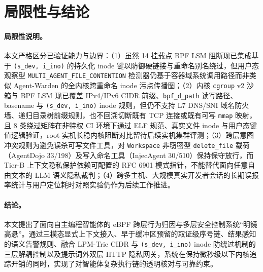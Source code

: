 \documentclass[UTF8,a4paper,zihao=-4,twocolumn]{ctexart}
\newcommand{\code}[1]{\texttt{\small #1}}
\begin{document}
\section{局限性与结论}
\label{sec:conclusion}

\paragraph{局限性说明。}
本文严格区分已验证能力与边界：（1）虽然 14 挂载点 BPF LSM 阻断现已集成基于 \code{(s\_dev, i\_ino)} 的持久化 inode 键以防御硬链接与重命名别名绕过，但用户态观察型 \code{MULTI\_AGENT\_FILE\_CONTENTION} 检测器仍基于容器域系统调用路径而非类似 Agent-Warden\cite{agentwarden2026} 的全内核跨重命名 inode 污点传播图；（2）内核 \code{cgroup} v2 沙箱与 BPF LSM 现已覆盖 IPv4/IPv6 CIDR 前缀、\code{bpf\_d\_path} 读写路径、basename 与 \code{(s\_dev, i\_ino)} inode 规则，但仍不支持 L7 DNS/SNI 域名防火墙、递归目录树前缀规则，也不回溯切断既有 TCP 连接或既有可写 \code{mmap} 映射，且 8 类绕过矩阵在非特权 CI 环境下通过 ELF 规范、真实文件 inode 与用户态键值逻辑验证，root 实机长稳内核阻断对比留待后续实机集群评测；（3）跨层意图冲突规则为避免误杀可写文件工具，对 \code{Workspace} 非窃密型 \code{delete\_file} 载荷（AgentDojo 33/198）及写入命名工具（InjecAgent 30/510）保持保守放行，而 Tier-B 上下文隐私保护依赖可配置的 RFC 6901 模式指针，不能替代面向任意自由文本的 LLM 语义隐私裁判；（4）跨多主机、大规模真实开发者会话的长期误报率统计与用户定位耗时对照实验仍作为后续工作推进。

\paragraph{结论。}
本文提出了面向自主编程智能体的 eBPF 跨层行为归因与多层安全控制系统“明镜高悬”。通过三模态显式上下文接入、早于缓冲区预留的取证级序号链、结果感知的语义告警规则、融合 LPM-Trie CIDR 与 \code{(s\_dev, i\_ino)} inode 防绕过机制的三层解耦控制以及提示词外双层 HTTP 隐私网关，系统在保持微秒级以下内核追踪开销的同时，实现了对智能体复杂执行链的透明核对与可靠约束。
\end{document}
